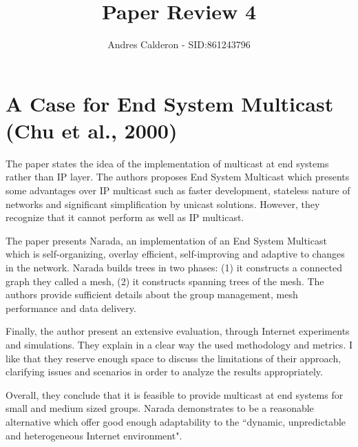 \documentclass[a4paper,10pt]{scrartcl}
\title{Paper Review 4}
\author{Andres Calderon - SID:861243796}
\begin{document}
\maketitle
\thispagestyle{empty}

\section*{A Case for End System Multicast (Chu et al., 2000)}
The paper states the idea of the implementation of multicast at end systems rather than IP layer.  The authors proposes End System Multicast which presents some advantages over IP multicast such as faster development, stateless nature of networks and significant simplification by unicast solutions.  However, they recognize that it cannot perform as well as IP multicast.

The paper presents Narada, an implementation of an End System Multicast which is self-organizing, overlay efficient, self-improving and adaptive to changes in the network.  Narada builds trees in two phases: (1) it constructs a connected graph they called a mesh, (2) it constructs spanning trees of the mesh.  The authors provide sufficient details about the group management, mesh performance and data delivery.  

Finally, the author present an extensive evaluation, through Internet experiments and simulations. They explain in a clear way the used methodology and metrics.  I like that they reserve enough space to discuss the limitations of their approach, clarifying issues and scenarios in order to analyze the results appropriately.

Overall, they conclude that it is feasible to provide multicast at end systems for small and medium sized groups. Narada demonstrates to be a reasonable alternative which offer good enough adaptability to the ``dynamic, unpredictable and heterogeneous Internet environment".

\end{document}
